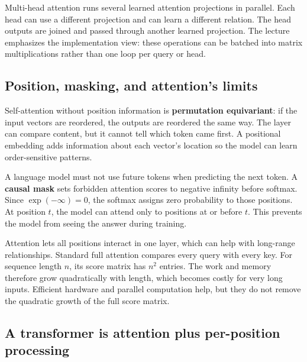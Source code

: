 Multi-head attention runs several learned attention projections in parallel. Each head can use a different projection and can learn a different relation. The head outputs are joined and passed through another learned projection. The lecture emphasizes the implementation view: these operations can be batched into matrix multiplications rather than one loop per query or head.

\subsection{Position, masking, and attention's limits}\label{04-visual-computing-ii-ch031-position-masking-and-attentions-limits}

\hypertarget{04-visual-computing-ii-ch031-position-masking-and-attentions-limits}{}

Self-attention without position information is \textbf{permutation equivariant}: if the input vectors are reordered, the outputs are reordered the same way. The layer can compare content, but it cannot tell which token came first. A positional embedding adds information about each vector's location so the model can learn order-sensitive patterns.

A language model must not use future tokens when predicting the next token. A \textbf{causal mask} sets forbidden attention scores to negative infinity before softmax. Since \(\exp(-\infty)=0\), the softmax assigns zero probability to those positions. At position \(t\), the model can attend only to positions at or before \(t\). This prevents the model from seeing the answer during training.

Attention lets all positions interact in one layer, which can help with long-range relationships. Standard full attention compares every query with every key. For sequence length \(n\), its score matrix has \(n^2\) entries. The work and memory therefore grow quadratically with length, which becomes costly for very long inputs. Efficient hardware and parallel computation help, but they do not remove the quadratic growth of the full score matrix.

\subsection{A transformer is attention plus per-position processing}\label{04-visual-computing-ii-ch031-a-transformer-is-attention-plus-per-position-processing}

\hypertarget{04-visual-computing-ii-ch031-a-transformer-is-attention-plus-per-position-processing}{}

